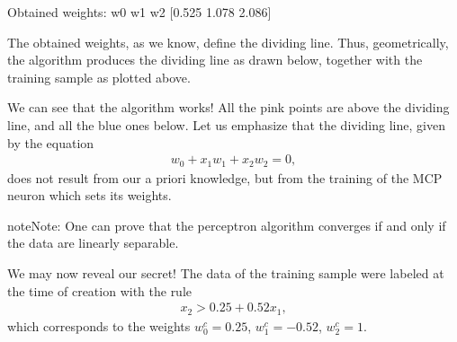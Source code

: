 \documentclass[letterpaper,10pt,english]{jupyterBook}
\begin{document}
\begin{sphinxVerbatim}[commandchars=\\\{\}]
        
\PYG{p}{[}\PYG{p}{]}           
             
\end{sphinxVerbatim}

\begin{sphinxVerbatim}[commandchars=\\\{\}]
Obtained weights:
  w0     w1     w2
[\PYGZhy{}0.525 \PYGZhy{}1.078  2.086]
\end{sphinxVerbatim}

\sphinxAtStartPar
The obtained weights, as we know, define the dividing line. Thus, geometrically, the algorithm produces the dividing line as drawn below, together with the training sample as plotted above.

\noindent{}

\sphinxAtStartPar
We can see that the algorithm works! All the pink points are above the dividing line, and all the blue ones below. Let us emphasize that the dividing line, given by the equation
\begin{equation*}
\begin{split} w_0+x_1 w_1 + x_2 w_2=0,\end{split}
\end{equation*}
\sphinxAtStartPar
does not result from our a priori knowledge, but from the training of the MCP neuron which sets its weights.

\begin{sphinxadmonition}{note}{Note:}
\sphinxAtStartPar
One can prove that the perceptron algorithm converges if and only if the data are linearly separable.
\end{sphinxadmonition}

\sphinxAtStartPar
We may now reveal our secret! The data of the training sample  were labeled at the time of creation with the rule
\begin{equation*}
\begin{split} x_2>0.25+0.52 x_1, \end{split}
\end{equation*}
\sphinxAtStartPar
which corresponds to the weights \(w_0^c=0.25\), \(w_1^c=-0.52\), \(w_2^c=1\).
\end{document}
